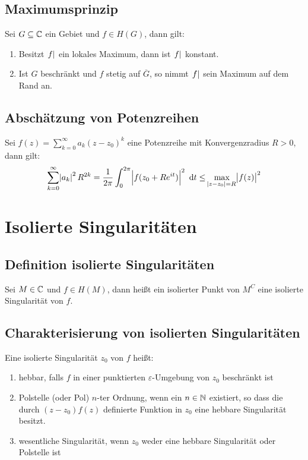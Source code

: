 \subsection{Maximumsprinzip}
Sei $G \subseteq \mathbb{C}$ ein Gebiet und $f \in H(G)$, dann gilt:
\begin{enumerate}
    \item Besitzt $\abs{f}$ ein lokales Maximum, dann ist $\abs{f}$ konstant.
    \item Ist $G$ beschränkt und $f$ stetig auf $\overline{G}$, so nimmt $\abs{f}$ sein Maximum auf dem
        Rand an.
\end{enumerate}

\subsection{Abschätzung von Potenzreihen}
Sei $f(z) = \sum_{k=0}^\infty a_k {(z-z_0)}^k$ eine Potenzreihe mit Konvergenzradius $R > 0$, dann gilt:
\begin{equation*}
    \sum_{k=0}^\infty \abs{a_k}^2 R^{2k} = \frac{1}{2 \pi} \int_0^{2\pi} \abs{f(z_0 + R e^{it})}^2 \text{ d}t
    \leq \max_{\abs{z-z_0} = R} \abs{f(z)}^2
\end{equation*}

\section{Isolierte Singularitäten}
\subsection{Definition isolierte Singularitäten}
Sei $M \in \mathbb{C}$ und $f \in H(M)$, dann heißt ein isolierter Punkt von $M^C$ eine isolierte Singularität von $f$.

\subsection{Charakterisierung von isolierten Singularitäten}
Eine isolierte Singularität $z_0$ von $f$ heißt:
\begin{enumerate}
    \item hebbar, falls $f$ in einer punktierten $\varepsilon$-Umgebung von $z_0$ beschränkt ist
    \item Polstelle (oder Pol) $n$-ter Ordnung, wenn ein $n \in \mathbb{N}$ existiert, so dass die durch ${(z-z_0)} f(z)$
        definierte Funktion in $z_0$ eine hebbare Singularität besitzt.
    \item wesentliche Singularität, wenn $z_0$ weder eine hebbare Singularität oder Polstelle ist
\end{enumerate}

